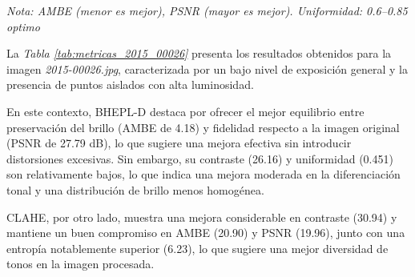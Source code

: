\documentclass[sigchi]{acmart}
\begin{document}
\begin{table}[H]
	\centering
	\caption{Métricas de calidad para la imagen 2015\_00026.jpg}
	\label{tab:metricas_2015_00026}
	\vspace{0.5em}


	\vspace{0.5em}
	\footnotesize%
	\textit{Nota: AMBE (menor es mejor), PSNR (mayor es mejor). Uniformidad: 0.6–0.85 optimo}
\end{table}

La \emph{Tabla \ref{tab:metricas_2015_00026}} presenta los resultados obtenidos para la imagen
\emph{2015-00026.jpg}, caracterizada por un bajo nivel de exposición general y la presencia de puntos
aislados con alta luminosidad.

En este contexto, BHEPL-D destaca por ofrecer el mejor equilibrio entre preservación del brillo
(AMBE de 4.18) y fidelidad respecto a la imagen original (PSNR de 27.79 dB), lo que sugiere una
mejora efectiva sin introducir distorsiones excesivas. Sin embargo, su contraste (26.16) y
uniformidad (0.451) son relativamente bajos, lo que indica una mejora moderada en la
diferenciación tonal y una distribución de brillo menos homogénea.

CLAHE, por otro lado, muestra una mejora considerable en contraste (30.94) y mantiene un buen
compromiso en AMBE (20.90) y PSNR (19.96), junto con una entropía notablemente superior (6.23),
lo que sugiere una mejor diversidad de tonos en la imagen procesada.
\end{document}
